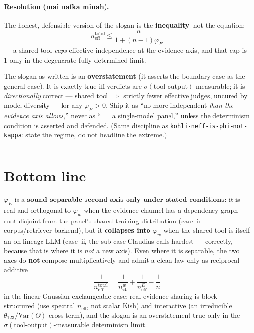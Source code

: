 \documentclass[11pt,a4paper]{article}
\begin{document}
\paragraph{Resolution (mai nafka minah).}
The honest, defensible version of the slogan is the \textbf{inequality}, not the equation:
\[
  \boxed{n_{\mathrm{eff}}^{\mathrm{total}} \leq \frac{n}{1+(n-1)\varphi_E}}
\]
--- a shared tool \emph{caps} effective independence at the evidence axis, and that cap is $1$
only in the degenerate fully-determined limit.

The slogan as written is an \textbf{overstatement} (it asserts the boundary case as the general
case).
It is exactly true iff verdicts are $\sigma(\text{tool-output})$-measurable; it is
\emph{directionally} correct --- shared tool $\Rightarrow$ strictly fewer effective judges,
uncured by model diversity --- for any $\varphi_E > 0$.
Ship it as ``no more independent \emph{than the evidence axis allows},'' never as ``$=$ a
single-model panel,'' unless the determinism condition is asserted and defended.
(Same discipline as \texttt{kohli-neff-is-phi-not-kappa}: state the regime, do not headline the
extreme.)

\bigskip
\hrule
\bigskip

\section*{Bottom line}

$\varphi_E$ is a \textbf{sound separable second axis only under stated conditions}: it is real and
orthogonal to $\varphi_w$ when the evidence channel has a dependency-graph root disjoint from the
panel's shared training distribution (case~i: corpus/retriever backend), but it \textbf{collapses
into $\varphi_w$} when the shared tool is itself an on-lineage LLM (case~ii, the sub-case Claudius
calls hardest --- correctly, because that is where it is \emph{not} a new axis).
Even where it is separable, the two axes do \textbf{not} compose multiplicatively and admit a
clean law only as reciprocal-additive
\[
  \frac{1}{n_{\mathrm{eff}}^{\mathrm{total}}}
  = \frac{1}{n_{\mathrm{eff}}^w} + \frac{1}{n_{\mathrm{eff}}^E} - \frac{1}{n}
\]
in the linear-Gaussian-exchangeable case; real evidence-sharing is block-structured
(use spectral $n_{\mathrm{eff}}$, not scalar Kish) and interactive (an irreducible
$\theta_{123}/\mathrm{Var}(\Theta)$ cross-term), and the slogan is an overstatement true only in
the $\sigma(\text{tool-output})$-measurable determinism limit.
\end{document}
